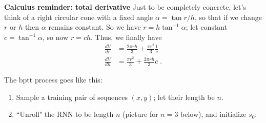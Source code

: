 \begin{examplebox} {\bf Calculus reminder: total derivative}
Just to be completely concrete, let's think of a right circular cone
with a fixed angle $\alpha = \tan r / h$, so that if we change $r$ or
$h$ then $\alpha$ remains constant.  So we have $r = h \tan^{-1}
\alpha$;  let constant $c = \tan^{-1} \alpha$, so now $r = c h$.
Thus, we finally have
\begin{align}
\frac{dV}{dr} & = \frac{2 \pi r h}{3} + \frac{\pi r^2}{3} \frac{1}{c} \\
\frac{dV}{dh} & = \frac{\pi r^2}{3} + \frac{2 \pi r h}{3} c \; .
\end{align}

\end{examplebox}

\noindent The {\sc bptt} process goes like this:
\begin{enumerate}[(1)]
\item
Sample a training pair of  sequences $(x, y)$; let their length be $n$.
\item
``Unroll" the RNN to be length $n$ (picture for $n = 3$ below), and
initialize $s_0$:


\end{enumerate}
